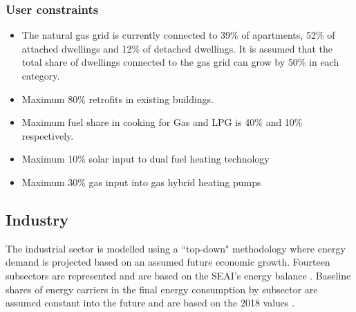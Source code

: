 \documentclass[gmd,manuscript]{copernicus}
\begin{document}
\subsubsection{User constraints}
\begin{itemize}
 \item The natural gas grid is currently connected to 39\% of apartments, 52\% of attached dwellings and 12\% of detached dwellings. It is assumed that the total share of dwellings connected to the gas grid can grow by 50\% in each category. 
\item Maximum 80\% retrofits in existing buildings.
\item Maximum fuel share in cooking for Gas and LPG is 40\% and 10\% respectively.
\item Maximum 10\% solar input to dual fuel heating technology
\item Maximum 30\% gas input into gas hybrid heating pumps

\end{itemize}



\subsection{Industry}
\label{ss:industry}
The industrial sector is modelled using a ``top-down" methodology where energy demand is projected based on an assumed future economic growth. Fourteen subsectors are represented and are based on the SEAI's energy balance \citep{SEAI2019}. Baseline shares of energy carriers in the final energy consumption by subsector are assumed constant into the future and are based on the 2018 values \citep{SEAI2019}. 

\end{document}
